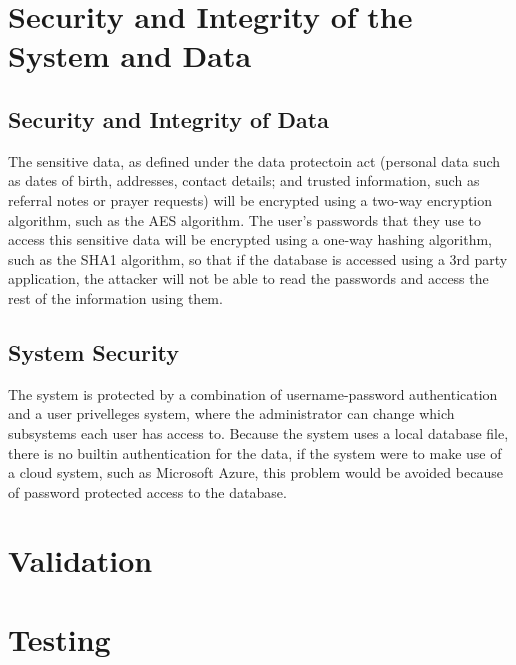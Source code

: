 \section{Security and Integrity of the System and Data}

\subsection{Security and Integrity of Data}
	The sensitive data, as defined under the data protectoin act (personal data such as dates of birth, addresses, contact details; and
	trusted information, such as referral notes or prayer requests) will be encrypted using a two-way encryption algorithm, such as the
	AES algorithm.
	The user's passwords that they use to access this sensitive data will be encrypted using a one-way hashing algorithm, such as the SHA1
	algorithm, so that if the database is accessed using a 3rd party application, the attacker will not be able to read the passwords and
	access the rest of the information using them.


\subsection{System Security}
	The system is protected by a combination of username-password authentication and a user privelleges system, where the administrator can
	change which subsystems each user has access to. Because the system uses a local database file, there is no builtin authentication for
	the data, if the system were to make use of a cloud system, such as Microsoft Azure, this problem would be avoided because of password
	protected  access to the database.

\section{Validation}

\section{Testing}

